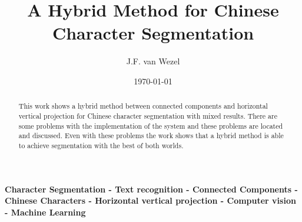 \documentclass[a4paper]{article}
\title{A Hybrid Method for Chinese Character Segmentation}
\author{J.F. van Wezel}
\affil{University of Groningen}
\date{\today}
\begin{document}
\maketitle


\begin{abstract}
   This work shows a hybrid method between connected components and horizontal vertical projection for Chinese character segmentation with mixed results. There are some problems with the implementation of the system and these problems are located and discussed. Even with these problems the work shows that a hybrid method is able to achieve segmentation with the best of both worlds.
\end{abstract}

\smallskip
\noindent \textbf{Character Segmentation - Text recognition - Connected Components - Chinese Characters - Horizontal vertical projection - Computer vision - Machine Learning}













\end{document}
